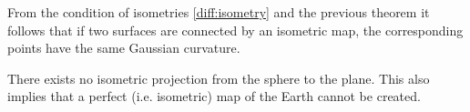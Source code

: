     \begin{property}
        From the condition of isometries \ref{diff:isometry} and the previous theorem it follows that if two surfaces are connected by an isometric map, the corresponding points have the same Gaussian curvature.
    \end{property}
    \begin{result}
        There exists no isometric projection from the sphere to the plane. This also implies that a perfect (i.e. isometric) map of the Earth cannot be created.
    \end{result}
